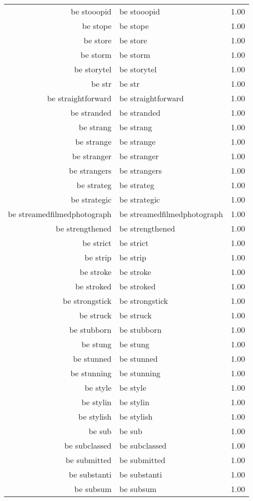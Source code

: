 \begin{table}[ht]
\begin{tabular}{rlr}
  be stooopid & be stooopid & 1.00 \\ 
  be stope & be stope & 1.00 \\ 
  be store & be store & 1.00 \\ 
  be storm & be storm & 1.00 \\ 
  be storytel & be storytel & 1.00 \\ 
  be str & be str & 1.00 \\ 
  be straightforward & be straightforward & 1.00 \\ 
  be stranded & be stranded & 1.00 \\ 
  be strang & be strang & 1.00 \\ 
  be strange & be strange & 1.00 \\ 
  be stranger & be stranger & 1.00 \\ 
  be strangers & be strangers & 1.00 \\ 
  be strateg & be strateg & 1.00 \\ 
  be strategic & be strategic & 1.00 \\ 
  be streamedfilmedphotograph & be streamedfilmedphotograph & 1.00 \\ 
  be strengthened & be strengthened & 1.00 \\ 
  be strict & be strict & 1.00 \\ 
  be strip & be strip & 1.00 \\ 
  be stroke & be stroke & 1.00 \\ 
  be stroked & be stroked & 1.00 \\ 
  be strongstick & be strongstick & 1.00 \\ 
  be struck & be struck & 1.00 \\ 
  be stubborn & be stubborn & 1.00 \\ 
  be stung & be stung & 1.00 \\ 
  be stunned & be stunned & 1.00 \\ 
  be stunning & be stunning & 1.00 \\ 
  be style & be style & 1.00 \\ 
  be stylin & be stylin & 1.00 \\ 
  be stylish & be stylish & 1.00 \\ 
  be sub & be sub & 1.00 \\ 
  be subclassed & be subclassed & 1.00 \\ 
  be submitted & be submitted & 1.00 \\ 
  be substanti & be substanti & 1.00 \\ 
  be subsum & be subsum & 1.00 \\ 

\end{tabular}
\end{table}
